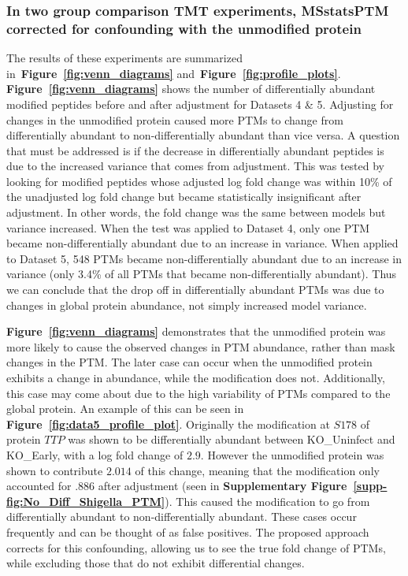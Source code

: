 \documentclass[mcp]{article}
\numberwithin{table}{section}
\def\figref#1{{\bf Figure~\ref{fig:#1}}}
\begin{document}
\subsubsection*{In two group comparison TMT experiments, MSstatsPTM corrected for confounding with the unmodified protein}

The results of these experiments are summarized in~\figref{venn_diagrams} and~\figref{profile_plots}. \figref{venn_diagrams} shows the number of differentially abundant modified peptides before and after adjustment for Datasets 4 \& 5. Adjusting for changes in the unmodified protein caused more PTMs to change from differentially abundant to non-differentially abundant than vice versa. A question that must be addressed is if the decrease in differentially abundant peptides is due to the increased variance that comes from adjustment. This was tested by looking for modified peptides whose adjusted log fold change was within 10\% of the unadjusted log fold change but became statistically insignificant after adjustment. In other words, the fold change was the same between models but variance increased. When the test was applied to Dataset 4, only one PTM became non-differentially abundant due to an increase in variance. When applied to Dataset 5, 548 PTMs became non-differentially abundant due to an increase in variance (only 3.4\% of all PTMs that became non-differentially abundant). Thus we can conclude that the drop off in differentially abundant PTMs was due to changes in global protein abundance, not simply increased model variance.

\figref{venn_diagrams} demonstrates that the unmodified protein was more likely to cause the observed changes in PTM abundance, rather than mask changes in the PTM. The later case can occur when the unmodified protein exhibits a change in abundance, while the modification does not. Additionally, this case may come about due to the high variability of PTMs compared to the global protein. An example of this can be seen in \figref{data5_profile_plot}. Originally the modification at $S178$ of protein $TTP$ was shown to be differentially abundant between KO\_Uninfect and KO\_Early, with a log fold change of $2.9$. However the unmodified protein was shown to contribute $2.014$ of this change, meaning that the modification only accounted for $.886$ after adjustment (seen in {\bf Supplementary Figure~\ref{supp-fig:No_Diff_Shigella_PTM}}). This caused the modification to go from differentially abundant to non-differentially abundant. These cases occur frequently and can be thought of as false positives. The proposed approach corrects for this confounding, allowing us to see the true fold change of PTMs, while excluding those that do not exhibit differential changes.
\end{document}
